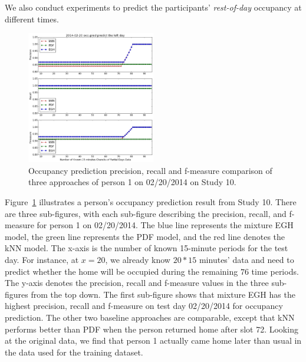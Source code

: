 We also conduct experiments to predict the participants' {\em rest-of-day} occupancy at different times. 
\begin{figure}[h]
\centering
\includegraphics[width=0.5\textwidth]{adlfigs/study10person12014-02-20occupied.png}
\caption{Occupancy prediction precision, recall and f-measure comparison of three approaches 
of person 1 on 02/20/2014 on Study 10.}
\label{fig_study10}
\end{figure}
Figure~\ref{fig_study10} illustrates a person's occupancy prediction result from Study 10.
There are three sub-figures, with 
each sub-figure describing the 
precision, recall, and f-measure 
for person 1 on 02/20/2014. 
The blue line represents the mixture EGH model,
the green line represents the PDF model,
and the red line denotes the kNN model. 
The x-axis is the number of known 15-minute periods for the test day. 
For instance, at $x=20$, 
we already know $20*15$ minutes' data 
and need to predict whether the home will be occupied during the remaining $76$ time periods. 
The y-axis denotes the precision, recall and f-measure values 
in the three sub-figures from the top down. 
The first sub-figure shows that mixture EGH has the highest precision, recall and f-measure on test day 02/20/2014 
for occupancy prediction. The other two baseline approaches are comparable, except that kNN performs better than PDF 
when the person returned home after slot 72. 
Looking at the original data, we find that person 1 actually came home later than usual 
in the data used for the training dataset. 

